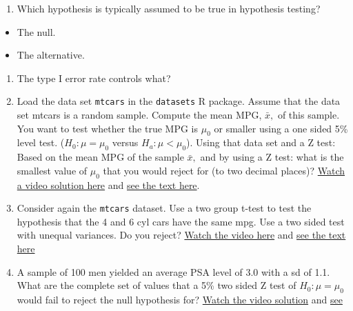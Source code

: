 \documentclass[]{article}
\begin{document}
\begin{enumerate}
\def\labelenumi{\arabic{enumi}.}
\itemsep1pt\parskip0pt
\item
  Which hypothesis is typically assumed to be true in hypothesis
  testing?
\end{enumerate}

\begin{itemize}
\itemsep1pt\parskip0pt
\item
  The null.
\item
  The alternative.
\end{itemize}

\begin{enumerate}
\def\labelenumi{\arabic{enumi}.}
\setcounter{enumi}{1}
\itemsep1pt\parskip0pt
\item
  The type I error rate controls what?
\item
  Load the data set \texttt{mtcars} in the \texttt{datasets} R package.
  Assume that the data set mtcars is a random sample. Compute the mean
  MPG, $\bar x,$ of this sample. You want to test whether the true MPG
  is $\mu_0$ or smaller using a one sided 5\% level test.
  ($H_0 : \mu = \mu_0$ versus $H_a : \mu < \mu_0$). Using that data set
  and a Z test: Based on the mean MPG of the sample $\bar x,$ and by
  using a Z test: what is the smallest value of $\mu_0$ that you would
  reject for (to two decimal places)?
  \href{https://www.youtube.com/watch?v=gReR0uxLnIA\&list=PLpl-gQkQivXhHOcVeU3bSJg78zaDYbP9L\&index=27}{Watch
  a video solution here} and
  \href{http://bcaffo.github.io/courses/06_StatisticalInference/homework/hw4.html\#3}{see
  the text here}.
\item
  Consider again the \texttt{mtcars} dataset. Use a two group t-test to
  test the hypothesis that the 4 and 6 cyl cars have the same mpg. Use a
  two sided test with unequal variances. Do you reject?
  \href{https://www.youtube.com/watch?v=Zo5TirzS9rU\&list=PLpl-gQkQivXhHOcVeU3bSJg78zaDYbP9L\&index=28}{Watch
  the video here} and
  \href{http://bcaffo.github.io/courses/06_StatisticalInference/homework/hw4.html\#4}{see
  the text here}
\item
  A sample of 100 men yielded an average PSA level of 3.0 with a sd of
  1.1. What are the complete set of values that a 5\% two sided Z test
  of $H_0 : \mu = \mu_0$ would fail to reject the null hypothesis for?
  \href{https://www.youtube.com/watch?v=TooyEaVgLZc\&list=PLpl-gQkQivXhHOcVeU3bSJg78zaDYbP9L\&index=29}{Watch
  the video solution} and
  \href{http://bcaffo.github.io/courses/06_StatisticalInference/homework/hw4.html\#5}{see
}
\end{enumerate}
\end{document}
